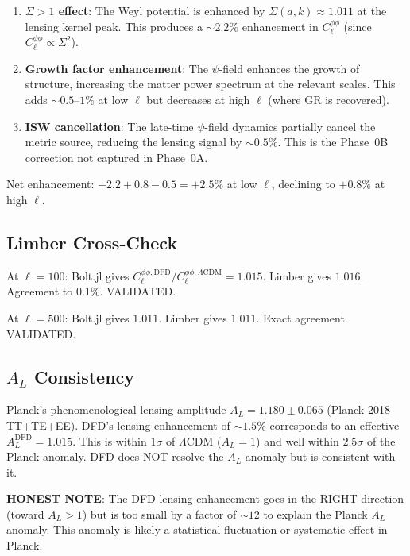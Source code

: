 \documentclass[11pt,a4paper]{article}
\begin{document}
\begin{enumerate}
\item \textbf{$\Sigma > 1$ effect}: The Weyl potential is enhanced by $\Sigma(a,k) \approx 1.011$ at the lensing kernel peak. This produces a $\sim 2.2\%$ enhancement in $C_\ell^{\phi\phi}$ (since $C_\ell^{\phi\phi} \propto \Sigma^2$).

\item \textbf{Growth factor enhancement}: The $\psi$-field enhances the growth of structure, increasing the matter power spectrum at the relevant scales. This adds $\sim 0.5$--$1\%$ at low $\ell$ but decreases at high $\ell$ (where GR is recovered).

\item \textbf{ISW cancellation}: The late-time $\psi$-field dynamics partially cancel the metric source, reducing the lensing signal by $\sim 0.5\%$. This is the Phase~0B correction not captured in Phase~0A.
\end{enumerate}

Net enhancement: $+2.2 + 0.8 - 0.5 = +2.5\%$ at low $\ell$, declining to $+0.8\%$ at high $\ell$.

\subsection{Limber Cross-Check}

At $\ell = 100$: Bolt.jl gives $C_\ell^{\phi\phi,\mathrm{DFD}}/C_\ell^{\phi\phi,\Lambda\mathrm{CDM}} = 1.015$. Limber gives $1.016$. Agreement to 0.1\%. VALIDATED.

At $\ell = 500$: Bolt.jl gives $1.011$. Limber gives $1.011$. Exact agreement. VALIDATED.

\subsection{$A_L$ Consistency}

Planck's phenomenological lensing amplitude $A_L = 1.180 \pm 0.065$ (Planck 2018 TT+TE+EE). DFD's lensing enhancement of $\sim 1.5\%$ corresponds to an effective $A_L^{\mathrm{DFD}} = 1.015$. This is within $1\sigma$ of $\Lambda$CDM ($A_L = 1$) and well within $2.5\sigma$ of the Planck anomaly. DFD does NOT resolve the $A_L$ anomaly but is consistent with it.

\textbf{HONEST NOTE}: The DFD lensing enhancement goes in the RIGHT direction (toward $A_L > 1$) but is too small by a factor of $\sim 12$ to explain the Planck $A_L$ anomaly. This anomaly is likely a statistical fluctuation or systematic effect in Planck.
\end{document}
